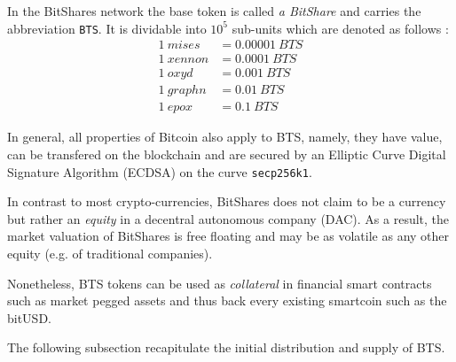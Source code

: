 In the BitShares network the base token is called \emph{a BitShare} and carries
the abbreviation \texttt{BTS}. It is dividable into $10^5$ sub-units which are
denoted as follows :
\begin{align*}
\SI{1}{mises } &= \SI{0.00001}{BTS}\\
\SI{1}{xennon} &= \SI{0.0001}{BTS}\\
\SI{1}{oxyd  } &= \SI{0.001}{BTS}\\
\SI{1}{graphn} &= \SI{0.01}{BTS}\\
\SI{1}{epox  } &= \SI{0.1}{BTS}
\end{align*}

In general, all properties of Bitcoin also apply to BTS, namely, they have
value, can be transfered on the blockchain and are secured by an Elliptic
Curve Digital Signature Algorithm (ECDSA) on the curve \texttt{secp256k1}.

In contrast to most crypto-currencies, BitShares does not claim to be a
currency but rather an \emph{equity} in a decentral autonomous company (DAC).
As a result, the market valuation of BitShares is free floating and may be as
volatile as any other equity (e.g. of traditional companies).

Nonetheless, BTS tokens can be used as \emph{collateral} in financial smart
contracts~\cite{bts:financial} such as market pegged assets and thus back every
existing smartcoin such as the bitUSD.


The following subsection recapitulate the initial distribution and supply of
BTS.
